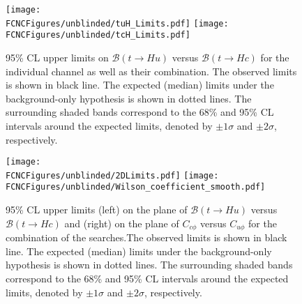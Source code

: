 \begin{figure}[htb]
\centering
\texttt{[image: \\FCNCFigures/unblinded/tuH\_Limits.pdf]}
\texttt{[image: \\FCNCFigures/unblinded/tcH\_Limits.pdf]}
\caption{95\% CL upper limits on $\mathcal{B}(t\rightarrow Hu)$ versus $\mathcal{B}(t\rightarrow Hc)$ for the individual channel as well as their combination. %
The observed limits is shown in black line. The expected (median) limits under the background-only hypothesis is shown in dotted lines. The surrounding shaded bands correspond to the 68\% and 95\% CL
intervals around the expected limits, denoted by $\pm1\sigma$ and $\pm2\sigma$, respectively. }
\label{fig:combined_limit}
\end{figure}


\begin{figure}[htb]
\centering
\texttt{[image: \\FCNCFigures/unblinded/2DLimits.pdf]}
\texttt{[image: \\FCNCFigures/unblinded/Wilson\_coefficient\_smooth.pdf]}
\caption{95\% CL upper limits (left) on the plane of $\mathcal{B}(t\rightarrow Hu)$ versus $\mathcal{B}(t\rightarrow Hc)$ and (right) on the plane of $C_{c\phi}$ versus $C_{u\phi}$ for the combination of the searches.The observed limits is shown in black line. The expected
(median) limits under the background-only hypothesis is shown in dotted lines. The surrounding shaded bands correspond to
the 68\% and 95\% CL intervals around the expected limits, denoted by $\pm1\sigma$ and $\pm2\sigma$, respectively.}
\label{fig:combined_2D_limit}
\end{figure}
